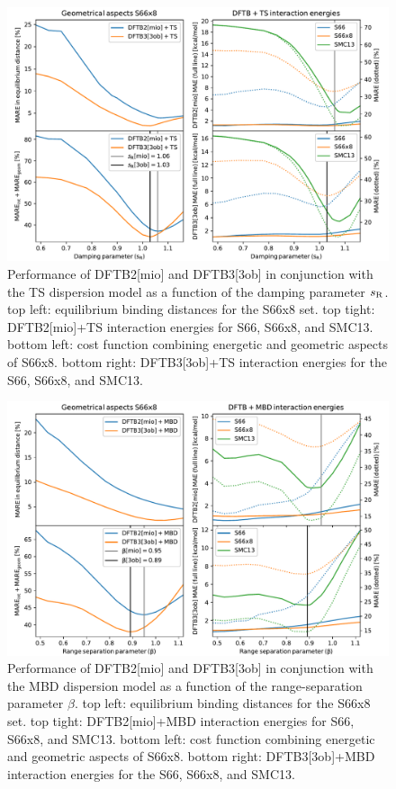 \documentclass[aip,jcp]{revtex4-1}
\begin{document}
\begin{figure}[htbp]
    \centering
    \includegraphics[scale=.66]{figures/SI_TSsR.pdf}
    \caption{Performance of DFTB2[mio] and DFTB3[3ob] in conjunction with the TS dispersion model as a function of the damping parameter $s_{\rm R}$. top left: equilibrium binding distances for the S66x8\cite{Rezac2011_S66x8} set. top tight: DFTB2[mio]+TS interaction energies for S66,\cite{Rezac2011_S66} S66x8, and SMC13.\cite{Ambrosetti2014_JPCL,Hermann2017,Stoehr2019_CSR} bottom left: cost function combining energetic and geometric aspects of S66x8. bottom right: DFTB3[3ob]+TS interaction energies for the S66, S66x8, and SMC13.}
    \label{sfig:SI_TS_sR}
\end{figure}
\begin{figure}[htbp]
    \centering
    \includegraphics[scale=.66]{figures/SI_MBDbeta.pdf}
    \caption{Performance of DFTB2[mio] and DFTB3[3ob] in conjunction with the MBD dispersion model as a function of the range-separation parameter $\beta$. top left: equilibrium binding distances for the S66x8\cite{Rezac2011_S66x8} set. top tight: DFTB2[mio]+MBD interaction energies for S66,\cite{Rezac2011_S66} S66x8, and SMC13.\cite{Ambrosetti2014_JPCL,Hermann2017,Stoehr2019_CSR} bottom left: cost function combining energetic and geometric aspects of S66x8. bottom right: DFTB3[3ob]+MBD interaction energies for the S66, S66x8, and SMC13.}
    \label{sfig:SI_MBD_beta}
\end{figure}



\end{document}
